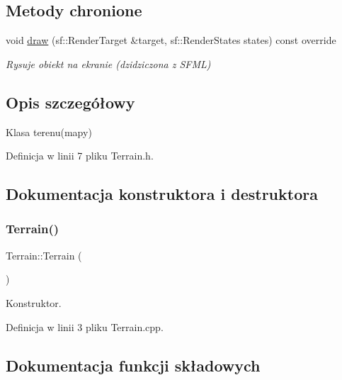 \subsection*{Metody chronione}
\begin{DoxyCompactItemize}
\item 
void \mbox{\hyperlink{class_terrain_a78fb38a85917a89fa9deb9eec9599b49}{draw}} (sf\+::\+Render\+Target \&target, sf\+::\+Render\+States states) const override
\begin{DoxyCompactList}\small\item\em Rysuje obiekt na ekranie (dzidziczona z S\+F\+ML) \end{DoxyCompactList}\end{DoxyCompactItemize}


\subsection{Opis szczegółowy}
Klasa terenu(mapy) 

Definicja w linii 7 pliku Terrain.\+h.



\subsection{Dokumentacja konstruktora i destruktora}
\mbox{\label{class_terrain_a7160a06ab07a86ed97d23374405e8ef6}} 
\subsubsection{\texorpdfstring{Terrain()}{Terrain()}}
{\footnotesize\ttfamily Terrain\+::\+Terrain (\begin{DoxyParamCaption}{ }\end{DoxyParamCaption})}



Konstruktor. 



Definicja w linii 3 pliku Terrain.\+cpp.



\subsection{Dokumentacja funkcji składowych}
\mbox{\label{class_terrain_a78fb38a85917a89fa9deb9eec9599b49}} 

